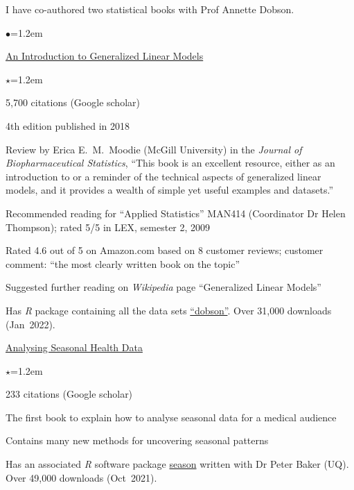 \documentclass[a4paper,11pt]{article}
\renewcommand{\labelitemi}{$\bullet$}
\renewcommand{\labelitemii}{$\star$}
\begin{document}
\begin{raggedright}
I have co-authored two statistical books with Prof Annette Dobson.
\begin{list}{\labelitemi}{\leftmargin=1.2em}\addtolength{\itemsep}{-0.5\baselineskip}
\item \href{http://www.crcpress.com/product/isbn/9781584889502}{An Introduction to Generalized Linear Models}
\begin{list}{\labelitemii}{\leftmargin=1.2em}\addtolength{\itemsep}{-0.3\baselineskip}
\item 5,700 citations (Google scholar)
\item 4th edition published in 2018
\item Review by Erica E.\ M.\ Moodie (McGill University) in the \textit{Journal of Biopharmaceutical Statistics}, ``This book is an excellent resource, either as an introduction to or a reminder of the technical aspects of generalized linear models, and it provides a wealth of simple yet useful examples and datasets.''
\item Recommended reading for ``Applied Statistics'' MAN414 (Coordinator Dr Helen Thompson); rated 5/5 in LEX, semester 2, 2009
\item Rated 4.6 out of 5 on Amazon.com based on 8 customer reviews; customer comment: ``the most clearly written book on the topic''
\item Suggested further reading on \textit{Wikipedia} page ``Generalized Linear Models''
\item Has \textit{R} package containing all the data sets \href{http://cran.r-project.org/web/packages/dobson/index.html}{``dobson''}. Over 31,000 downloads (Jan~2022). %
\end{list}
\item \href{http://www.springer.com/statistics/stats+life+sci/book/978-3-642-10747-4}{Analysing Seasonal Health Data}
\begin{list}{\labelitemii}{\leftmargin=1.2em}\addtolength{\itemsep}{-0.3\baselineskip}
\item 233 citations (Google scholar)
\item The first book to explain how to analyse seasonal data for a medical audience
\item Contains many new methods for uncovering seasonal patterns
\item Has an associated \textit{R} software package \href{http://cran.r-project.org/web/packages/season/index.html}{season} written with Dr Peter Baker (UQ). Over 49,000 downloads (Oct~2021).

\end{list}
\end{list}
\end{raggedright}
\end{document}
